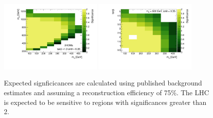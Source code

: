 \begin{figure}
\centering
\includegraphics[width=0.45\textwidth]{texinputs/04_grid/figures/monoz/leptonic/mAma_Significance_ll.pdf}
\includegraphics[width=0.45\textwidth]{texinputs/04_grid/figures/monoz/leptonic/tanbma_Significance_ll.pdf}
\caption{Expected signficicances are calculated using published background estimates and assuming a reconstruction efficiency of 75\%.  The LHC is expected to be sensitive to regions with significances greater than 2.}
\end{figure}

